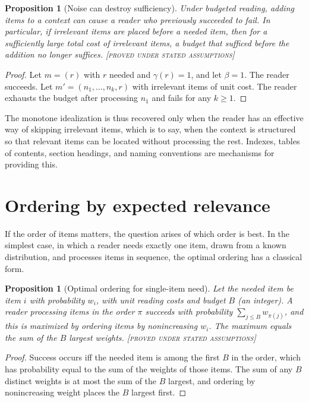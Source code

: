 \documentclass[11pt,twoside,openright]{book}
\theoremstyle{plain}
\newtheorem{proposition}[theorem]{Proposition}
\theoremstyle{definition}
\theoremstyle{remark}
\newcommand{\Proved}{\textup{\textsc{[proved under stated assumptions]}}}
\begin{document}
\begin{proposition}[Noise can destroy sufficiency]\label{prop:noise}
Under budgeted reading, adding items to a context can cause a reader who previously succeeded to fail. In particular, if irrelevant items are placed before a needed item, then for a sufficiently large total cost of irrelevant items, a budget that sufficed before the addition no longer suffices.
\Proved{}
\end{proposition}

\begin{proof}
Let $m=(r)$ with $r$ needed and $\gamma(r)=1$, and let $\beta=1$. The reader succeeds. Let $m'=(n_1,\dots,n_k,r)$ with irrelevant items of unit cost. The reader exhausts the budget after processing $n_1$ and fails for any $k\ge1$.
\end{proof}

The monotone idealization is thus recovered only when the reader has an effective way of skipping irrelevant items, which is to say, when the context is structured so that relevant items can be located without processing the rest. Indexes, tables of contents, section headings, and naming conventions are mechanisms for providing this.

\section{Ordering by expected relevance}

If the order of items matters, the question arises of which order is best. In the simplest case, in which a reader needs exactly one item, drawn from a known distribution, and processes items in sequence, the optimal ordering has a classical form.

\begin{proposition}[Optimal ordering for single-item need]\label{prop:ordering}
Let the needed item be item $i$ with probability $w_i$, with unit reading costs and budget $B$ (an integer). A reader processing items in the order $\pi$ succeeds with probability $\sum_{j\le B}w_{\pi(j)}$, and this is maximized by ordering items by nonincreasing $w_i$. The maximum equals the sum of the $B$ largest weights.
\Proved{}
\end{proposition}

\begin{proof}
Success occurs iff the needed item is among the first $B$ in the order, which has probability equal to the sum of the weights of those items. The sum of any $B$ distinct weights is at most the sum of the $B$ largest, and ordering by nonincreasing weight places the $B$ largest first.
\end{proof}
\end{document}
